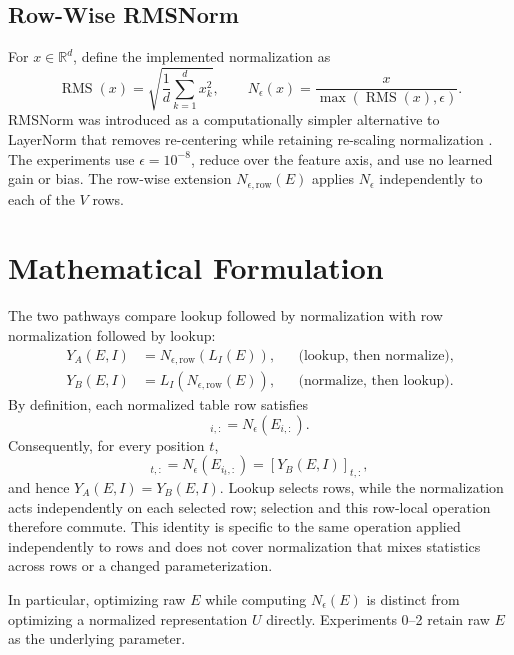 \documentclass[conference]{IEEEtran}
\begin{document}
\subsection{Row-Wise RMSNorm}
For \(x\in\mathbb{R}^d\), define the implemented normalization as
\begin{equation}
\operatorname{RMS}(x)=\sqrt{\frac{1}{d}\sum_{k=1}^{d}x_k^2},\qquad
N_{\epsilon}(x)=\frac{x}{\max(\operatorname{RMS}(x),\epsilon)}.
\label{eq:rmsnorm}
\end{equation}
RMSNorm was introduced as a computationally simpler alternative to LayerNorm that removes re-centering while retaining re-scaling normalization \cite{zhang2019rmsnorm}. The experiments use \(\epsilon=10^{-8}\), reduce over the feature axis, and use no learned gain or bias. The row-wise extension \(N_{\epsilon,\mathrm{row}}(E)\) applies \(N_{\epsilon}\) independently to each of the \(V\) rows.

\section{Mathematical Formulation}
The two pathways compare lookup followed by normalization with row normalization followed by lookup:
\begin{align}
Y_A(E,I)&=N_{\epsilon,\mathrm{row}}\!\left(L_I(E)\right), &&\text{(lookup, then normalize)},\label{eq:patha}\\
Y_B(E,I)&=L_I\!\left(N_{\epsilon,\mathrm{row}}(E)\right), &&\text{(normalize, then lookup)}.\label{eq:pathb}
\end{align}
By definition, each normalized table row satisfies
\begin{equation}
[N_{\epsilon,\mathrm{row}}(E)]_{i,:}=N_{\epsilon}(E_{i,:}).
\label{eq:rowwise}
\end{equation}
Consequently, for every position \(t\),
\begin{equation}
[Y_A(E,I)]_{t,:}=N_{\epsilon}(E_{i_t,:})=[Y_B(E,I)]_{t,:},
\label{eq:identity}
\end{equation}
and hence \(Y_A(E,I)=Y_B(E,I)\). Lookup selects rows, while the normalization acts independently on each selected row; selection and this row-local operation therefore commute. This identity is specific to the same operation applied independently to rows and does not cover normalization that mixes statistics across rows or a changed parameterization.

In particular, optimizing raw \(E\) while computing \(N_{\epsilon}(E)\) is distinct from optimizing a normalized representation \(U\) directly. Experiments 0--2 retain raw \(E\) as the underlying parameter.
\end{document}
